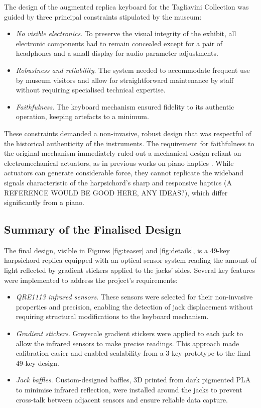 The design of the augmented replica keyboard for the Tagliavini Collection was guided by three principal constraints stipulated by the museum:
\begin{itemize}
\item \emph{No visible electronics}. To preserve the visual integrity of the exhibit, all electronic components had to remain concealed except for a pair of headphones and a small display for audio parameter adjustments.
\item \emph{Robustness and reliability}. The system needed to accommodate frequent use by museum visitors and allow for straightforward maintenance by staff without requiring specialised technical expertise.
\item \emph{Faithfulness}. The keyboard mechanism ensured fidelity to its authentic operation, keeping artefacts to a minimum. 
\end{itemize}
These constraints demanded a non-invasive, robust design that was respectful of the historical authenticity of the instruments. The requirement for faithfulness to the original mechanism immediately ruled out a mechanical design reliant on electromechanical actuators, as in previous works on piano haptics \cite{Timmermans2020,Gillespie1996}. While actuators can generate considerable force, they cannot replicate the wideband signals characteristic of the harpsichord's sharp and responsive haptics (A REFERENCE WOULD BE GOOD HERE, ANY IDEAS?), which differ significantly from a piano.



\subsection{Summary of the Finalised Design}

The final design, visible in Figures \ref{fig:teaser} and \ref{fig:details}, is a 49-key harpsichord replica equipped with an optical sensor system reading the amount of light reflected by gradient stickers applied to the jacks' sides. Several key features were implemented to address the project’s requirements:

\begin{itemize}
\item \emph{QRE1113 infrared sensors}. These sensors were selected for their non-invasive properties and precision, enabling the detection of jack displacement without requiring structural modifications to the keyboard mechanism.
\item \emph{Gradient stickers}. Greyscale gradient stickers were applied to each jack to allow the infrared sensors to make precise readings. This approach made calibration easier and enabled scalability from a 3-key prototype to the final 49-key design.
\item \emph{Jack baffles}. Custom-designed baffles, 3D printed from dark pigmented PLA to minimise infrared reflection, were installed around the jacks to prevent cross-talk between adjacent sensors and ensure reliable data capture.
\end{itemize}

